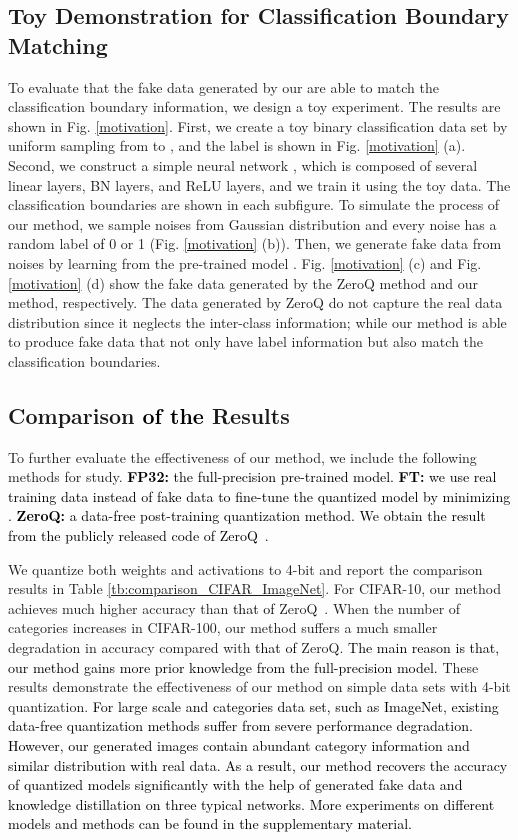 \documentclass[runningheads]{llncs}
\def\lhk{\textcolor{black}}
\def\new{\textcolor{black}}
\begin{document}
\subsection{Toy Demonstration for Classification Boundary Matching}
To evaluate that the fake data generated by our  are able to match the classification boundary information, we design a toy experiment. The results are shown in Fig. \ref{motivation}.
First, we create a toy binary classification data set by uniform sampling from  to , and the label is shown in Fig. \ref{motivation} (a). 
Second, we construct a simple neural network , which is composed of several linear layers, BN layers, and ReLU layers, and we train it using the toy data. The classification boundaries are shown in each subfigure.
To simulate the process of our method, we sample noises from Gaussian distribution and every noise has a random label \new{of} 0 or 1 (Fig. \ref{motivation} (b)).
Then, we generate fake data from noises by learning from the pre-trained model .
Fig. \ref{motivation} (c) and Fig. \ref{motivation} (d) show the fake data generated by the ZeroQ method and our method,  respectively. 
The data generated by ZeroQ do not capture the real data distribution since it neglects the inter-class information; while our method is able to produce fake data that not only have label information but also match the classification boundaries.


\subsection{Comparison \new{of the} Results}
To further evaluate the effectiveness of our method, we include the following methods for study. \lhk{\textbf{FP32:} the full-precision pre-trained model. \textbf{FT:} we use real training data instead of fake data to  fine-tune the quantized model by minimizing . \textbf{ZeroQ:} a data-free post-training quantization method. We obtain the result from the publicly released code of ZeroQ~\cite{Cai_2020_CVPR}.}

We quantize both weights and activations to 4-bit and report the comparison results in Table \ref{tb:comparison_CIFAR_ImageNet}. For CIFAR-10, our method achieves much higher accuracy than \new{that of} ZeroQ~\cite{Cai_2020_CVPR}. When the number of categories increases in CIFAR-100, our method suffers a much smaller degradation in accuracy compared with \new{that of} ZeroQ. \lhk{The main reason is that, our method gains more prior knowledge from the full-precision model.} These results demonstrate the effectiveness of our method on simple data sets with 4-bit quantization. 
\lhk{\new{For} large scale and categories data set\new{, such as} ImageNet, existing data-free quantization methods suffer from severe performance degradation. However, our generated images contain abundant category information and similar distribution with real data. As a result, our method recovers the accuracy of quantized models significantly with the help of generated fake data and knowledge distillation on three typical networks.}
\new{More experiments on different models and methods can be found in the supplementary material.}
\end{document}
